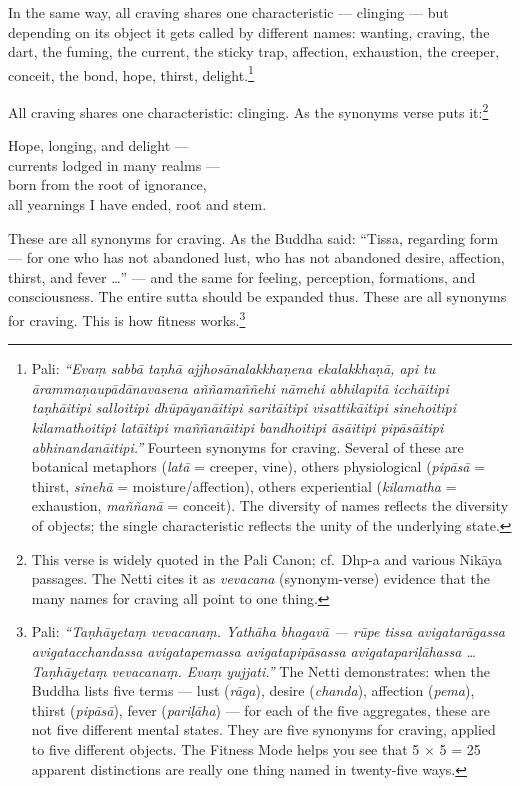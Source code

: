 In the same way, all craving shares one characteristic --- clinging --- but depending on its object it gets called by different names: wanting, craving, the dart, the fuming, the current, the sticky trap, affection, exhaustion, the creeper, conceit, the bond, hope, thirst, delight.\footnote{Pali: \textit{``Evaṃ sabbā taṇhā ajjhosānalakkhaṇena ekalakkhaṇā, api tu ārammaṇaupādānavasena aññamaññehi nāmehi abhilapitā icchāitipi taṇhāitipi salloitipi dhūpāyanāitipi saritāitipi visattikāitipi sinehoitipi kilamathoitipi latāitipi maññanāitipi bandhoitipi āsāitipi pipāsāitipi abhinandanāitipi.''} Fourteen synonyms for craving. Several of these are botanical metaphors (\textit{latā} = creeper, vine), others physiological (\textit{pipāsā} = thirst, \textit{sinehā} = moisture/affection), others experiential (\textit{kilamatha} = exhaustion, \textit{maññanā} = conceit). The diversity of names reflects the diversity of objects; the single characteristic reflects the unity of the underlying state.}

All craving shares one characteristic: clinging. As the synonyms verse puts it:\footnote{This verse is widely quoted in the Pali Canon; cf.\ Dhp-a and various Nikāya passages. The Netti cites it as \textit{vevacana} (synonym-verse) evidence that the many names for craving all point to one thing.}

\begin{versebox}
Hope, longing, and delight ---\\
currents lodged in many realms ---\\
born from the root of ignorance,\\
all yearnings I have ended, root and stem.
\end{versebox}

These are all synonyms for craving. As the Buddha said: ``Tissa, regarding form --- for one who has not abandoned lust, who has not abandoned desire, affection, thirst, and fever \ldots'' --- and the same for feeling, perception, formations, and consciousness. The entire sutta should be expanded thus. These are all synonyms for craving. This is how fitness works.\footnote{Pali: \textit{``Taṇhāyetaṃ vevacanaṃ. Yathāha bhagavā --- rūpe tissa avigatarāgassa avigatacchandassa avigatapemassa avigatapipāsassa avigatapariḷāhassa \ldots Taṇhāyetaṃ vevacanaṃ. Evaṃ yujjati.''} The Netti demonstrates: when the Buddha lists five terms --- lust (\textit{rāga}), desire (\textit{chanda}), affection (\textit{pema}), thirst (\textit{pipāsā}), fever (\textit{pariḷāha}) --- for each of the five aggregates, these are not five different mental states. They are five synonyms for craving, applied to five different objects. The Fitness Mode helps you see that 5 $\times$ 5 = 25 apparent distinctions are really one thing named in twenty-five ways.}

